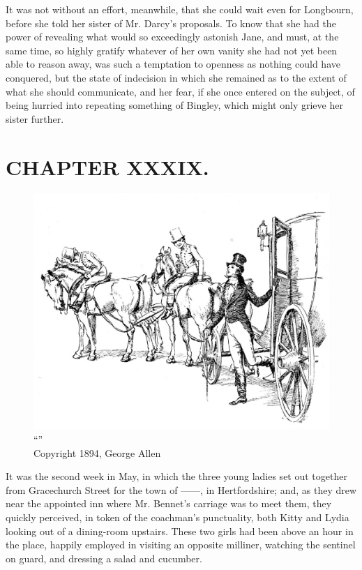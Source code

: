 It was not without an effort, meanwhile, that she could wait even for Longbourn, before she told her sister of Mr. Darcy's proposals. To know that she had the power of revealing what would so exceedingly astonish Jane, and must, at the same time, so highly gratify whatever of her own vanity she had not yet been able to reason away, was such a temptation to openness as nothing could have conquered, but the state of indecision in which she remained as to the extent of what she should communicate, and her fear, if she once entered on the subject, of being hurried into repeating something of Bingley, which might only grieve her sister further.



\chapter{CHAPTER XXXIX.}

\begin{figure}[htbp]
    \centering
    \includegraphics[width=\textwidth]{illustrations/i_031.jpg}
    \caption{“”\\ Copyright 1894, George Allen}
    \label{fig:image}
\end{figure}


It was the second week in May, in which the three young ladies set out together from Gracechurch Street for the town of ------, in Hertfordshire; and, as they drew near the appointed inn where Mr. Bennet's carriage was to meet them, they quickly perceived, in token of the coachman's punctuality, both Kitty and Lydia looking out of a dining-room upstairs. These two girls had been above an hour in the place, happily employed in visiting an opposite milliner, watching the sentinel on guard, and dressing a salad and cucumber.

